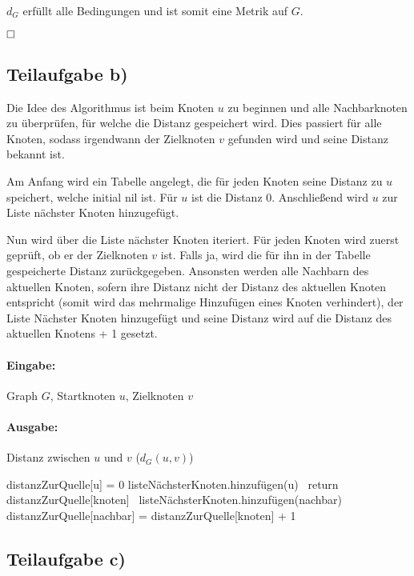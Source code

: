 \documentclass[12pt]{scrartcl}%
\theoremstyle{nonumberplain}
\begin{document}
$d_G$ erfüllt alle Bedingungen und ist somit eine Metrik auf $G$.

$\hfill \square$

\subsection*{Teilaufgabe b)}

Die Idee des Algorithmus ist beim Knoten $u$ zu beginnen und alle Nachbarknoten zu überprüfen, für welche die Distanz gespeichert wird. Dies passiert für alle Knoten, sodass irgendwann der Zielknoten $v$ gefunden wird und seine Distanz bekannt ist.

Am Anfang wird ein Tabelle angelegt, die für jeden Knoten seine Distanz zu $u$ speichert, welche initial nil ist. Für $u$ ist die Distanz 0. Anschließend wird $u$ zur Liste nächster Knoten hinzugefügt. 

Nun wird über die Liste nächster Knoten iteriert. Für jeden Knoten wird zuerst geprüft, ob er der Zielknoten $v$ ist. Falls ja, wird die für ihn in der Tabelle gespeicherte Distanz zurückgegeben. Ansonsten werden alle Nachbarn des aktuellen Knoten, sofern ihre Distanz nicht der Distanz des aktuellen Knoten entspricht (somit wird das mehrmalige Hinzufügen eines Knoten verhindert), der Liste Nächster Knoten hinzugefügt und seine Distanz wird auf die Distanz des aktuellen Knotens + 1 gesetzt.

\paragraph{Eingabe:} Graph $G$, Startknoten $u$, Zielknoten $v$

\paragraph{Ausgabe:} Distanz zwischen $u$ und $v$ ($d_G(u,v)$)

\begin{algorithm}
	distanzZurQuelle[u] = 0\;
	listeNächsterKnoten.hinzufügen(u)\;
	 {
		 {\
			return distanzZurQuelle[knoten]\;
		}	
		 {
			 {\
				listeNächsterKnoten.hinzufügen(nachbar)\;
				distanzZurQuelle[nachbar] = distanzZurQuelle[knoten] + 1\;
			}
		}
	}
\end{algorithm}

\subsection*{Teilaufgabe c)}
\end{document}
